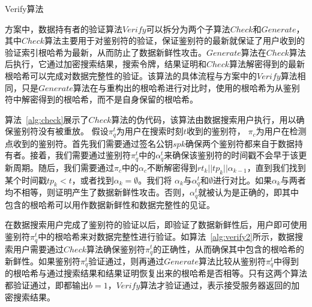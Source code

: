 \begin{algorithm}[t]
  \caption{Verify算法}
  \label{alg:verify2}
  \begin{algorithmic}[1]

  \end{algorithmic}
\end{algorithm}

\multi 方案中，数据持有者的验证算法$Verify$可以拆分为两个子算法$Check$和$Generate$，其中$Check$算法主要用于对鉴别符的验证，保证鉴别符的最新就保证了用户收到的验证索引根哈希为最新，从而防止了数据新鲜性攻击。$Generate$算法在$Check$算法后执行，它通过加密搜索结果，搜索令牌，结果证明和$Check$算法解密得到的最新根哈希可以完成对数据完整性的验证。该算法的具体流程与\single 方案中的$Verify$算法相同，只是$Generate$算法在与重构出的根哈希进行对比时，使用的根哈希为从鉴别符中解密得到的根哈希，而不是自身保留的根哈希。

算法~\ref{alg:check}展示了$Check$算法的伪代码，该算法由数据搜索用户执行，用以确保鉴别符没有被重放。
假设$\pi^t_q$为用户在搜索时刻$t$收到的鉴别符， $\pi_c$为用户在检测点收到的鉴别符。首先我们需要通过签名公钥$spk$确保两个鉴别符都来自于数据持有者。接着，我们需要通过鉴别符$\pi^t_q$中的$\alpha^t_q$来确保该鉴别符的时间戳不会早于该更新周期。随后，我们需要通过$\pi_c$中的$\alpha_c$不断解密得到$rt_k||tp_k||\alpha_{k-1}$，直到我们找到某个时间戳$tp_k < t$，或者找到$\alpha_k = \emptyset$。我们将  $\alpha_k$与$\alpha^t_q$和$\emptyset$进行对比。如果$\alpha_k$与两者均不相等，则证明产生了数据新鲜性攻击。否则，$\alpha^t_q$就被认为是正确的，即其中包含的根哈希可以用作数据新鲜性和数据完整性的见证。



在数据搜索用户完成了鉴别符的验证以后，即验证了数据新鲜性后，用户即可使用鉴别符$\pi^t_q$中的根哈希来对数据完整性进行验证。如算法~\ref{alg:verify2}所示，数据搜索用户需要通过$Check$算法确保鉴别符$\pi^t_q$的正确性，从而确保其中包含的根哈希的新鲜性。如果鉴别符$\pi^t_q$验证通过，则再通过$Generate$算法比较从鉴别符$\pi^t_q$中得到的根哈希与通过搜索结果和结果证明恢复出来的根哈希是否相等。只有这两个算法都验证通过，即都输出$b=1$，$Verify$算法才验证通过，表示接受服务器返回的加密搜索结果。


